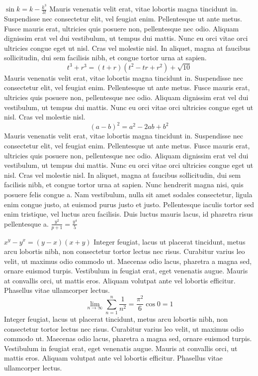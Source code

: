 \documentclass{article}
\begin{document}
\(
\sin k  =  k -\frac{k^{3}}{3!}
\)
Mauris venenatis velit erat, vitae lobortis magna tincidunt in. Suspendisse nec consectetur elit, vel feugiat enim. Pellentesque ut ante metus. Fusce mauris erat, ultricies quis posuere non, pellentesque nec odio. Aliquam dignissim erat vel dui vestibulum, ut tempus dui mattis. Nunc eu orci vitae orci ultricies congue eget ut nisl. Cras vel molestie nisl. In aliquet, magna at faucibus sollicitudin, dui sem facilisis nibh, et congue tortor urna at sapien.
\[ t^{3} + r^{3} = (t+r)(t^{2}-tr+r^{2}) + \sqrt{10} \]
Mauris venenatis velit erat, vitae lobortis magna tincidunt in. Suspendisse nec consectetur elit, vel feugiat enim. Pellentesque ut ante metus. Fusce mauris erat, ultricies quis posuere non, pellentesque nec odio. Aliquam dignissim erat vel dui vestibulum, ut tempus dui mattis. Nunc eu orci vitae orci ultricies congue eget ut nisl. Cras vel molestie nisl.
\begin{equation}
(a-b)^{2}=a^{2}-2ab+b^{2} 
\end{equation}
Mauris venenatis velit erat, vitae lobortis magna tincidunt in. Suspendisse nec consectetur elit, vel feugiat enim. Pellentesque ut ante metus. Fusce mauris erat, ultricies quis posuere non, pellentesque nec odio. Aliquam dignissim erat vel dui vestibulum, ut tempus dui mattis. Nunc eu orci vitae orci ultricies congue eget ut nisl. Cras vel molestie nisl. In aliquet, magna at faucibus sollicitudin, dui sem facilisis nibh, et congue tortor urna at sapien.
Nunc hendrerit magna nisi, quis posuere felis congue a. Nam vestibulum, nulla sit amet sodales consectetur, ligula enim congue justo, at euismod purus justo et justo. Pellentesque iaculis tortor sed enim tristique, vel luctus arcu facilisis. Duis luctus mauris lacus, id pharetra risus pellentesque a.
$\frac{ y^{2} }{ p+1 } = \frac{ y^{4} }{ 5 }$

\begin{math}
	x^{y}-y^{x} = (y - x)(x + y)
\end{math}
 Integer feugiat, lacus ut placerat tincidunt, metus arcu lobortis nibh, non consectetur tortor lectus nec risus. Curabitur varius leo velit, ut maximus odio commodo ut. Maecenas odio lacus, pharetra a magna sed, ornare euismod turpis. Vestibulum in feugiat erat, eget venenatis augue. Mauris at convallis orci, ut mattis eros. Aliquam volutpat ante vel lobortis efficitur. Phasellus vitae ullamcorper lectus.
$$
\lim_{n \to \infty}
\sum_{n=1}^n \frac{1}{n^2}
= \frac{\pi^2}{6} \cos{0} = 1
$$
 Integer feugiat, lacus ut placerat tincidunt, metus arcu lobortis nibh, non consectetur tortor lectus nec risus. Curabitur varius leo velit, ut maximus odio commodo ut. Maecenas odio lacus, pharetra a magna sed, ornare euismod turpis. Vestibulum in feugiat erat, eget venenatis augue. Mauris at convallis orci, ut mattis eros. Aliquam volutpat ante vel lobortis efficitur. Phasellus vitae ullamcorper lectus.
\end{document}
